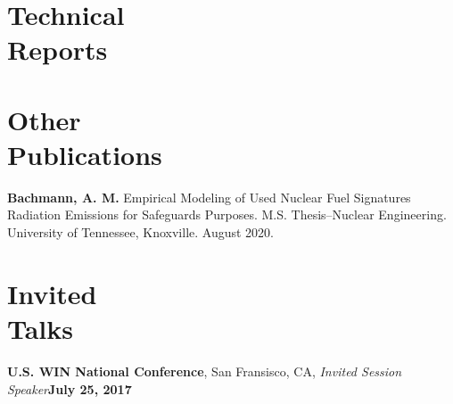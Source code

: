 \documentclass[margin,line]{resume}
\begin{document}
\begin{resume}
    \section{\mysidestyle Technical\\Reports}
    \begin{bibenum}
        \item {}
    \end{bibenum}

    \section{\mysidestyle Other\\Publications}
    \begin{bibenum}
        \item {}
        \item \textbf{Bachmann, A. M.} Empirical Modeling of Used Nuclear Fuel Signatures Radiation Emissions for Safeguards Purposes.
        M.S. Thesis--Nuclear Engineering. University of Tennessee, Knoxville.  August 2020.
    \end{bibenum}
    \section{\mysidestyle Invited\\Talks}
    \textbf{U.S. WIN National Conference}, San Fransisco, CA, \emph{Invited Session Speaker}\hfill\textbf{July 25, 2017}


\end{resume}
\end{document}
